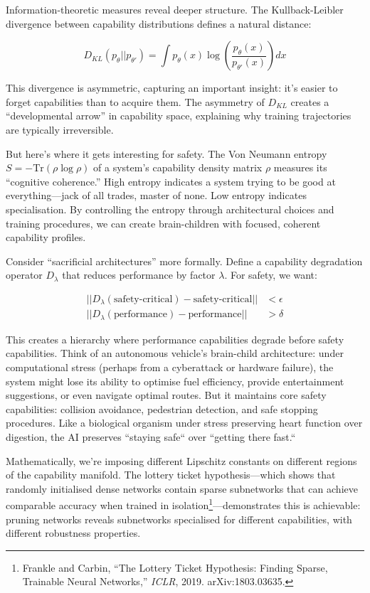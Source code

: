 \documentclass[acmsmall,screen]{acmart}
\begin{document}
Information-theoretic measures reveal deeper structure.
The Kullback-Leibler divergence between capability distributions defines a natural distance:

\begin{equation}
D_{KL}(p_\theta || p_{\theta'}) = \int p_\theta(x) \log\left(\frac{p_\theta(x)}{p_{\theta'}(x)}\right) dx
\end{equation}

This divergence is asymmetric, capturing an important insight: it's easier to forget capabilities than to acquire them. The asymmetry of $D_{KL}$ creates a ``developmental arrow'' in capability space, explaining why training trajectories are typically irreversible.

But here's where it gets interesting for safety. The Von Neumann entropy $S = -\text{Tr}(\rho \log \rho)$ of a system's capability density matrix $\rho$ measures its ``cognitive coherence.'' High entropy indicates a system trying to be good at everything---jack of all trades, master of none. Low entropy indicates specialisation. By controlling the entropy through architectural choices and training procedures, we can create brain-children with focused, coherent capability profiles.

Consider ``sacrificial architectures'' more formally. Define a capability degradation operator $D_\lambda$ that reduces performance by factor $\lambda$. For safety, we want:

\begin{align}
||D_\lambda(\text{safety-critical}) - \text{safety-critical}|| &< \epsilon \\ ||D_\lambda(\text{performance}) - \text{performance}|| &> \delta
\end{align}

This creates a hierarchy where performance capabilities degrade before safety capabilities.
Think of an autonomous vehicle's brain-child architecture: under computational stress (perhaps from a cyberattack or hardware failure), the system might lose its ability to optimise fuel efficiency, provide entertainment suggestions, or even navigate optimal routes.
But it maintains core safety capabilities: collision avoidance, pedestrian detection, and safe stopping procedures.
Like a biological organism under stress preserving heart function over digestion, the AI preserves ``staying safe`` over ``getting there fast.``

Mathematically, we're imposing different Lipschitz constants on different regions of the capability manifold.
The lottery ticket hypothesis---which shows that randomly initialised dense networks contain sparse subnetworks that can achieve comparable accuracy when trained in isolation\footnote{Frankle and Carbin, ``The Lottery Ticket Hypothesis: Finding Sparse, Trainable Neural Networks,'' \textit{ICLR}, 2019. arXiv:1803.03635.}---demonstrates this is achievable: pruning networks reveals subnetworks specialised for different capabilities, with different robustness properties.
\end{document}
